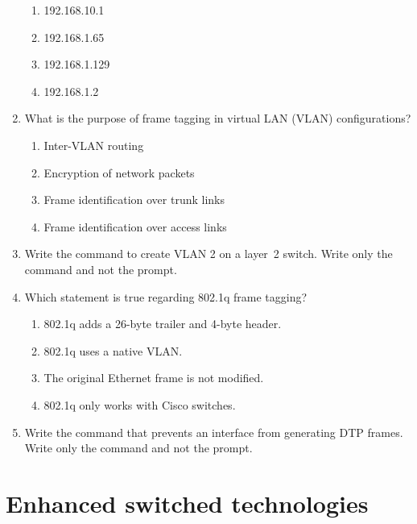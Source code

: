 \documentclass[b5paper,11pt]{memoir}
\begin{document}
\begin{enumerate}
  \begin{figure}
  \centering
  \caption{}
  \end{figure}

  \begin{enumerate}
  \tightlist
  \item
    192.168.10.1
  \item
    192.168.1.65
  \item
    192.168.1.129
  \item
    192.168.1.2
  \end{enumerate}
\item
   What is the
  purpose of frame tagging in virtual LAN (VLAN) configurations?

  \begin{enumerate}
  \tightlist
  \item
    Inter-VLAN routing
  \item
    Encryption of network packets
  \item
    Frame identification over trunk links
  \item
    Frame identification over access links
  \end{enumerate}
\item
  Write the command to create VLAN 2 on a layer~2 switch. Write only the
  command and not the prompt.
\item
  Which statement is true regarding 802.1q frame tagging?

  \begin{enumerate}
  \tightlist
  \item
    802.1q adds a 26-byte trailer and 4-byte header.
  \item
    802.1q uses a native VLAN.
  \item
    The original Ethernet frame is not modified.
  \item
    802.1q only works with Cisco switches.
  \end{enumerate}
\item
  Write the command that prevents an interface from generating DTP
  frames. Write only the command and not the prompt.
\end{enumerate}




\chapter{Enhanced switched technologies}
\end{document}
